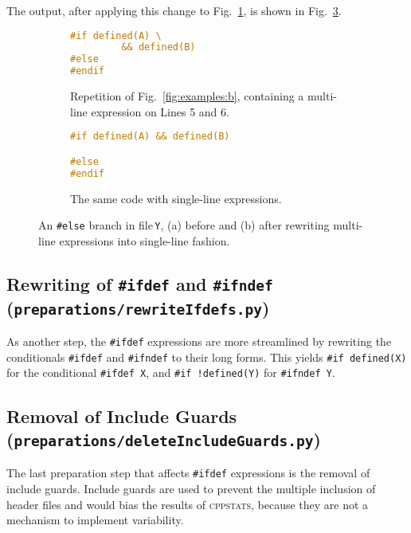 \documentclass[a4paper]{scrartcl}
\newcommand\code[1]{\texttt{#1}}
\newcommand\tool[1]{\textsc{#1}}
\newcommand\ifdeff[1]{\code{\##1}\xspace}
\newcommand\ifdef[0]{{\upshape\ifdeff{ifdef}}\xspace}
\newcommand\cppstats[0]{\tool{cppstats}\xspace}
\begin{document}
The output, after applying this change to Fig.\ \ref{fig:multiline:a}, is shown in Fig.\ \ref{fig:multiline:b}.

\begin{figure}[ht]
  \centering
  \begin{subfigure}[b]{0.45\textwidth}
		\begin{lstlisting}[language=C, firstnumber=5]
#if defined(A) \
		 && defined(B)
#else 
#endif
		\end{lstlisting}
		\caption{Repetition of Fig.\ \ref{fig:examples:b}, containing a multi-line expression on Lines 5 and 6.}
		\label{fig:multiline:a}
  \end{subfigure}
  \hfill
  \begin{subfigure}[b]{0.45\textwidth}
		\begin{lstlisting}[language=C, firstnumber=5]
#if defined(A) && defined(B)

#else 
#endif
		\end{lstlisting}
		\caption{The same code with single-line expressions.}
		\label{fig:multiline:b}
  \end{subfigure}
  
  \caption{An \ifdeff{else} branch in file\,\code{Y}, (a) before and (b) after rewriting multi-line expressions into single-line fashion.}
  
\end{figure}


\subsection{Rewriting of \ifdeff{ifdef} and \ifdeff{ifndef} {\footnotesize (\code{preparations/rewriteIfdefs.py})}}

As another step, the \ifdef expressions are more streamlined by rewriting the conditionals \ifdeff{ifdef} and \ifdeff{ifndef} to their long forms.
This yields \ifdeff{if defined(X)} for the conditional \ifdeff{ifdef X}, and \ifdeff{if\,!defined(Y)} for \ifdeff{ifndef Y}.


\subsection{Removal of Include Guards {\footnotesize (\code{preparations/deleteIncludeGuards.py})}}

The last preparation step that affects \ifdef expressions is the removal of include guards.
Include guards are used to prevent the multiple inclusion of header files and would bias the results of \cppstats, because they are not a mechanism to implement variability.
\end{document}
